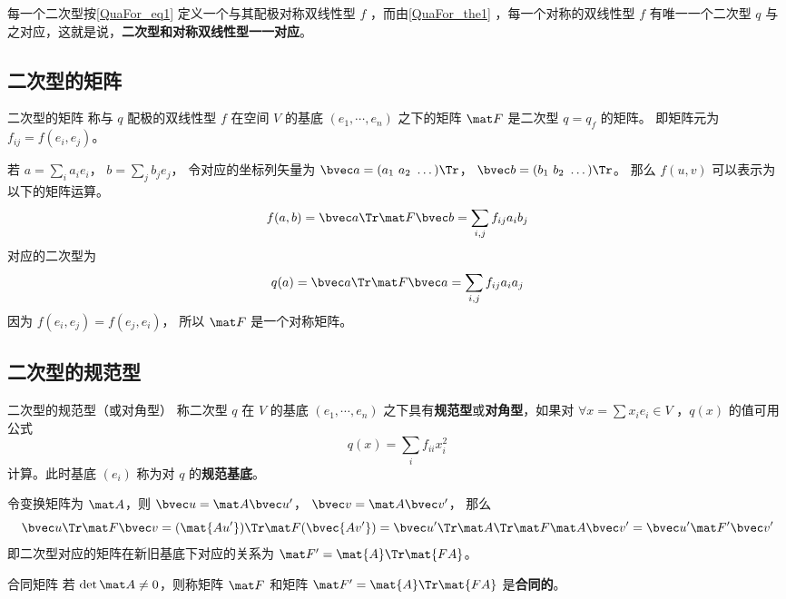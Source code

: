 每一个二次型按\autoref{QuaFor_eq1} 定义一个与其配极对称双线性型 $f$ ，而由\autoref{QuaFor_the1} ，每一个对称的双线性型 $f$ 有唯一一个二次型 $q$ 与之对应，这就是说，\textbf{二次型和对称双线性型一一对应}。

\subsection{二次型的矩阵}
\begin{definition}{二次型的矩阵}
称与 $q$ 配极的双线性型 $f$ 在空间 $V$ 的基底 $(e_1,\cdots,e_n)$ 之下的矩阵 $\mat F$ 是二次型 $q=q_f$ 的矩阵。 即矩阵元为 $f_{ij} = f(e_i, e_j)$。
\end{definition}

若 $a = \sum_i a_i e_i$， $b = \sum_j b_j e_j$， 令对应的坐标列矢量为 $\bvec a = (a_1\ a_2\ \dots)\Tr$， $\bvec b = (b_1\ b_2\ \dots)\Tr$。 那么 $f(u, v)$ 可以表示为以下的矩阵运算。
\begin{equation}
f(a, b) = \bvec a\Tr \mat F \bvec b = \sum_{i,j} f_{ij}a_i b_j
\end{equation}
对应的二次型为
\begin{equation}
q(a) = \bvec a\Tr \mat F \bvec a = \sum_{i,j} f_{ij}a_i a_j
\end{equation}
因为 $f(e_i, e_j) = f(e_j, e_i)$， 所以 $\mat F$ 是一个对称矩阵。

\subsection{二次型的规范型}
\begin{definition}{二次型的规范型（或对角型）}\label{QuaFor_def1}
称二次型 $q$ 在 $V$ 的基底 $(e_1,\cdots,e_n)$ 之下具有\textbf{规范型}或\textbf{对角型}，如果对 $\forall x=\sum x_i e_i\in V$ ，$q(x)$ 的值可用公式
\begin{equation}
q(x)=\sum_{i}f_{ii}x_i^2
\end{equation}
计算。此时基底 $(e_i)$ 称为对 $q$ 的\textbf{规范基底}。
\end{definition}

令变换矩阵为 $\mat A$，则 $\bvec u = \mat A \bvec u'$， $\bvec v = \mat A \bvec v'$， 那么
\begin{equation}
\bvec u\Tr \mat F \bvec v = (\mat {Au'})\Tr \mat F (\bvec {Av'}) = {\bvec u'}\Tr \mat A\Tr\mat F \mat A \bvec v'=\bvec u'\mat F' \bvec v'
\end{equation}
即二次型对应的矩阵在新旧基底下对应的关系为 $\mat F'=\mat{A}\Tr \mat{FA}$。
\begin{definition}{合同矩阵}
若 $\det \mat A\neq 0$，则称矩阵 $\mat F$ 和矩阵 $\mat F'=\mat{A}\Tr \mat{FA}$ 是\textbf{合同的}。
\end{definition}

